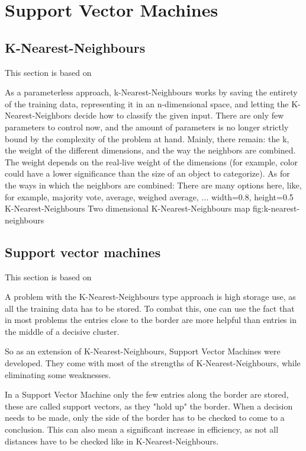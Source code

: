 \section{Support Vector Machines}
\label{sec:SVM}
\subsection{K-Nearest-Neighbours}
This section is based on \cite[p. 783f]{MA}

As a parameterless approach, k-Nearest-Neighbours works by saving the entirety of the training data, representing it in an n-dimensional space, and letting the K-Nearest-Neighbors decide how to classify the given input. There are only few parameters to control now, and the amount of parameters is no longer strictly bound by the complexity of the problem at hand. Mainly, there remain: the k, the weight of the different dimensions, and the way the neighbors are combined. 
The weight depends on the real-live weight of the dimensions (for example, color could have a lower significance than the size of an object to categorize).
As for the ways in which the neighbors are combined: There are many options here, like, for example, majority vote, average, weighed average, ...
    {width=0.8\textwidth, height=0.5\textheight} %
    {K-Nearest-Neighbours}   %
    {Two dimensional K-Nearest-Neighbours map}   %
    {fig:k-nearest-neighbours}    %

\subsection{Support vector machines}
This section is based on \cite[p. 744f]{MA}

A problem with the K-Nearest-Neighbours type approach is high storage use, as all the training data has to be stored. To combat this, one can use the fact that in most problems the entries close to the border are more helpful than entries in the middle of a decisive cluster.

So as an extension of K-Nearest-Neighbours, Support Vector Machines were developed. They come with most of the strengths of K-Nearest-Neighbours, while eliminating some weaknesses.

In a Support Vector Machine only the few entries along the border are stored, these are called support vectors, as they "hold up" the border. When a decision needs to be made, only the side of the border has to be checked to come to a conclusion. This can also mean a significant increase in efficiency, as not all distances have to be checked like in K-Nearest-Neighbours.

